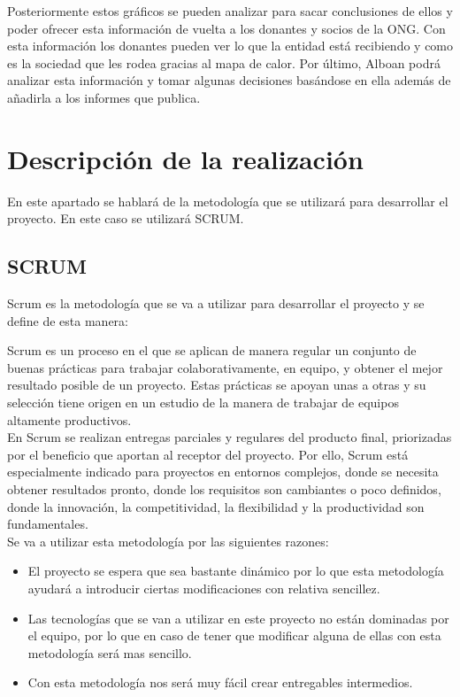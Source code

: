 Posteriormente estos gráficos se pueden analizar para sacar conclusiones de ellos y poder ofrecer esta información de vuelta a los donantes y socios de la ONG. Con esta información los donantes pueden ver lo que la entidad está recibiendo y como es la sociedad que les rodea gracias al mapa de calor. Por último, Alboan podrá analizar esta información y tomar algunas decisiones basándose en ella además de añadirla a los informes que publica.


\newpage

\section{Descripción de la realización}
En este apartado se hablará de la metodología que se utilizará para desarrollar el proyecto. En este caso se utilizará SCRUM.\\

\subsection{SCRUM}

Scrum es la metodología que se va a utilizar para desarrollar el proyecto y se define de esta manera:

Scrum es un proceso en el que se aplican de manera regular un conjunto de buenas prácticas para trabajar colaborativamente, en equipo, y obtener el mejor resultado posible de un proyecto. Estas prácticas se apoyan unas a otras y su selección tiene origen en un estudio de la manera de trabajar de equipos altamente productivos.\\

En Scrum se realizan entregas parciales y regulares del producto final, priorizadas por el beneficio que aportan al receptor del proyecto. Por ello, Scrum está especialmente indicado para proyectos en entornos complejos, donde se necesita obtener resultados pronto, donde los requisitos son cambiantes o poco definidos, donde la innovación, la competitividad, la flexibilidad y la productividad son fundamentales.\\

Se va a utilizar esta metodología por las siguientes razones:

\begin{itemize}
	\item El proyecto se espera que sea bastante dinámico por lo que esta metodología ayudará a introducir ciertas modificaciones con relativa sencillez.
	\item Las tecnologías que se van a utilizar en este proyecto no están dominadas por el equipo, por lo que en caso de tener que modificar alguna de ellas con esta metodología será mas sencillo.
	\item Con esta metodología nos será muy fácil crear entregables intermedios.
\end{itemize}

